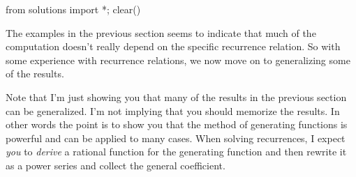 \begin{python0}
from solutions import *; clear() 
\end{python0}

The examples in the previous section seems to indicate
that much of the computation doesn't really depend on 
the specific recurrence relation.
So with some experience with recurrence relations, we now
move on to generalizing some of the results.

Note that I'm just showing you that many of the results
in the previous section can be generalized. 
I'm not implying that you should memorize the results.
In other words the point is to show you that the
method of generating functions is powerful and can be applied to 
many cases.
When solving recurrences, I expect \textit{you} to \textit{derive} a rational
function for the generating function and then rewrite it as a power series
and collect the general coefficient.

